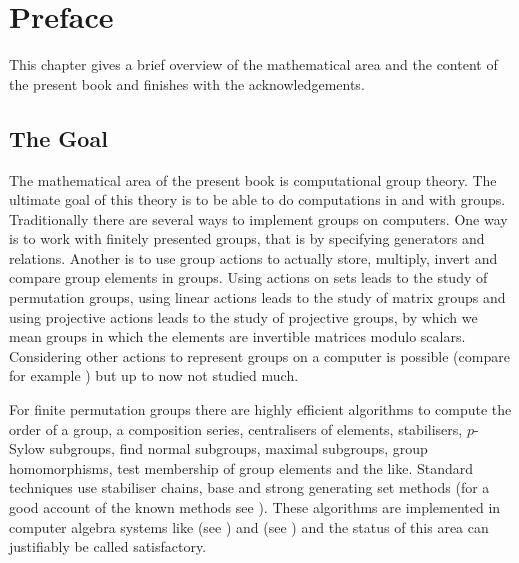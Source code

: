 
\chapter*{Preface}

\renewcommand{\thechapter}{0}

This chapter gives a brief overview of the mathematical area and the 
content of the present book and finishes with the acknowledgements.

\section{The Goal}

The mathematical area of the present book is computational group
theory. The ultimate goal of this theory is to be able to do
computations in and with groups. Traditionally there are several ways
to implement groups on computers. One way is to work with finitely
presented groups, that is by specifying generators and relations.
Another is to use group actions to actually store,
multiply, invert and compare group elements in groups. Using 
actions on sets leads to the study of permutation groups, using linear
actions leads to the study of matrix groups and using projective
actions leads to the study of projective groups, by which we mean
groups in which the elements are invertible matrices modulo scalars.
Considering other actions to represent groups on a computer is
possible (compare for example \cite{Kohl}) but up to now not studied much.

For finite permutation groups there are highly efficient
algorithms to compute the order of a group, a composition series,
centralisers of elements, stabilisers, $p$-Sylow subgroups, find
normal subgroups, maximal subgroups, group homomorphisms, test
membership of group elements and the like.
Standard techniques use stabiliser chains, base and strong generating
set methods (for a good account of the known methods see \cite{Ser}). 
These algorithms are implemented in computer algebra
systems like {\GAP} (see \cite{GAP4}) and {\MAGMA} (see \cite{Magma})
and the status of this area can justifiably be called satisfactory.

